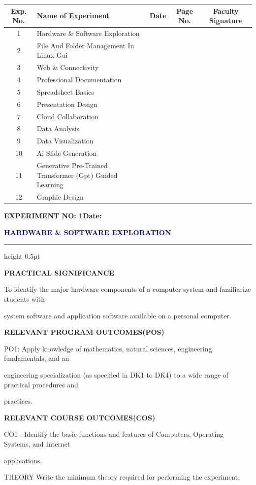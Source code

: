 \documentclass[10pt,a4paper]{article}
\newcommand{\expheading}[2]{%
  \vspace{0.1cm}\noindent\textbf{\large EXPERIMENT NO: #1}\hfill\textbf{Date: #2}\par
}
\newcommand{\exptitle}[1]{%
  \begin{center}\vspace{-2mm}\textcolor{navy}{\fontsize{20}{22}\selectfont\bfseries #1}\end{center}
  \vspace{1mm}\hrule height 0.5pt\vspace{3mm}
}
\begin{document}
\begin{tabularx}{\textwidth}{|c|X|c|c|c|}\hline
\textbf{Exp. No.} & \textbf{Name of Experiment} & \textbf{Date} & \textbf{Page No.} & \textbf{Faculty Signature}\\\hline
1 & Hardware \& Software Exploration & & & \\\hline
2 & File And Folder Management In Linux Gui & & & \\\hline
3 & Web \& Connectivity & & & \\\hline
4 & Professional Documentation & & & \\\hline
5 & Spreadsheet Basics & & & \\\hline
6 & Presentation Design & & & \\\hline
7 & Cloud Collaboration & & & \\\hline
8 & Data Analysis & & & \\\hline
9 & Data Visualization & & & \\\hline
10 & Ai Slide Generation & & & \\\hline
11 & Generative Pre-Trained Transformer (Gpt) Guided Learning & & & \\\hline
12 & Graphic Design & & & \\\hline
\end{tabularx}
\clearpage
\clearpage
\expheading{1}{\underline{\hspace{1.8cm}}}
\exptitle{HARDWARE \& SOFTWARE EXPLORATION}
\medskip\noindent\textbf{PRACTICAL SIGNIFICANCE}\par
\noindent To identify the major hardware components of a computer system and familiarize students with\par
\noindent system software and application software available on a personal computer.\par

\medskip\noindent\textbf{RELEVANT PROGRAM OUTCOMES(POS)}\par
\noindent PO1: Apply knowledge of mathematics, natural sciences, engineering fundamentals, and an\par
\noindent engineering specialization (as specified in DK1 to DK4) to a wide range of practical procedures and\par
\noindent practices.\par

\medskip\noindent\textbf{RELEVANT COURSE OUTCOMES(COS)}\par
\noindent CO1 : Identify the basic functions and features of Computers, Operating Systems, and Internet\par
\noindent applications.\par
\noindent THEORY Write the minimum theory required for performing the experiment.\par
\end{document}
